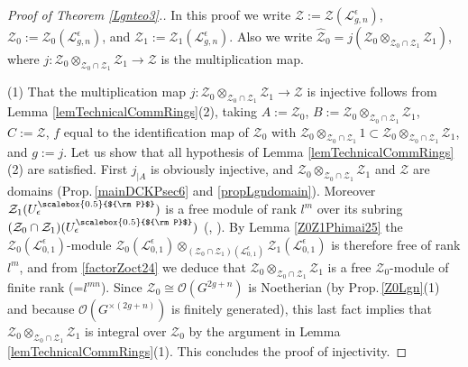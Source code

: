 \documentclass[11pt]{amsart}
\newcommand{\e}{\epsilon}
\newcommand{\Ll}{\mathcal{L}}
\newcommand{\Oo}{\mathcal{O}}
\newcommand{\Pup}{{\scalebox{0.5}{${\rm P}$}}}
\begin{document}
\begin{proof}[Proof of Theorem \ref{Lgnteo3}.] In this proof we write $\mathcal{Z} := \mathcal{Z}(\mathcal{L}_{g,n}^{\e})$, $\mathcal{Z}_0 := \mathcal{Z}_0(\mathcal{L}_{g,n}^{\e})$, and $\mathcal{Z}_1 := \mathcal{Z}_1(\mathcal{L}_{g,n}^{\e})$. Also we write $\hat{\mathcal{Z}}_0 = j(\mathcal{Z}_0\otimes_{\mathcal{Z}_0 \cap \mathcal{Z}_1} \mathcal{Z}_1)$, where $j\colon \mathcal{Z}_0 \otimes_{\mathcal{Z}_0 \cap \mathcal{Z}_1} \mathcal{Z}_1 \to \mathcal{Z}$ is the multiplication map.

\indent (1) That the multiplication map $j\colon \mathcal{Z}_0 \otimes_{\mathcal{Z}_0 \cap \mathcal{Z}_1} \mathcal{Z}_1 \to \mathcal{Z}$ is injective follows from Lemma \ref{lemTechnicalCommRings}(2), taking $A:=\mathcal{Z}_0$, $B:=\mathcal{Z}_0 \otimes_{\mathcal{Z}_0 \cap \mathcal{Z}_1} \mathcal{Z}_1$, $C:= \mathcal{Z}$, $f$ equal to the identification map of $\mathcal{Z}_0$ with $\mathcal{Z}_0 \otimes_{\mathcal{Z}_0 \cap \mathcal{Z}_1} 1 \subset \mathcal{Z}_0\otimes_{\mathcal{Z}_0 \cap \mathcal{Z}_1} \mathcal{Z}_1$, and $g:=j$. Let us show that all hypothesis of Lemma \ref{lemTechnicalCommRings}(2) are satisfied. First $j_{\vert A}$ is obviously injective, and $\mathcal{Z}_0\otimes_{\mathcal{Z}_0 \cap \mathcal{Z}_1} \mathcal{Z}_1$ and $\mathcal{Z}$ are domains (Prop.\,\ref{mainDCKPsec6} and \ref{propLgndomain}). Moreover $\mathcal{Z}_1(U_\e^\Pup)$ is a free module of rank $l^m$ over its subring $(\mathcal{Z}_0 \cap \mathcal{Z}_1)(U_\e^\Pup)$ (\cite[$\S$21.2-21.3]{DCP}, \cite[$\S$6]{DC-K-P1}). By Lemma \ref{Z0Z1Phimai25} the $\mathcal{Z}_0(\Ll_{0,1}^\e)$-module $\mathcal{Z}_0(\Ll_{0,1}^\e) \otimes_{(\mathcal{Z}_0 \cap \mathcal{Z}_1)(\Ll_{0,1}^\e)} \mathcal{Z}_1(\mathcal{L}_{0,1}^{\e})$ is therefore free of rank $l^m$, and from \eqref{factorZoct24} we deduce that $\mathcal{Z}_0\otimes_{\mathcal{Z}_0 \cap \mathcal{Z}_1} \mathcal{Z}_1$ is a free $\mathcal{Z}_0$-module of finite rank (=$l^{mn}$). Since $\mathcal{Z}_0 \cong \Oo(G^{2g+n})$ is Noetherian (by Prop.\,\ref{Z0Lgn}(1) and because $\mathcal{O}(G^{\times (2g+n)})$ is finitely generated), this last fact implies that $\mathcal{Z}_0\otimes_{\mathcal{Z}_0 \cap \mathcal{Z}_1} \mathcal{Z}_1$ is integral over $\mathcal{Z}_0$ by the argument in Lemma \ref{lemTechnicalCommRings}(1). This concludes the proof of injectivity. 


\end{proof}
\end{document}
